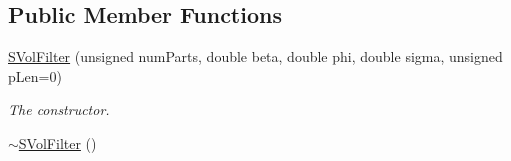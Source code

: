 \subsection*{Public Member Functions}
\begin{DoxyCompactItemize}
\item 
\hyperlink{classSVolFilter_a508bc5de545367e0ef0ee683b9e3b7b4}{S\+Vol\+Filter} (unsigned num\+Parts, double beta, double phi, double sigma, unsigned p\+Len=0)
\begin{DoxyCompactList}\small\item\em The constructor. \end{DoxyCompactList}\item 
\hyperlink{classSVolFilter_a5b894ffc4a62d9e441d9070df9727eb6}{$\sim$\+S\+Vol\+Filter} ()\hypertarget{classSVolFilter_a5b894ffc4a62d9e441d9070df9727eb6}{}\label{classSVolFilter_a5b894ffc4a62d9e441d9070df9727eb6}


\end{DoxyCompactItemize}
